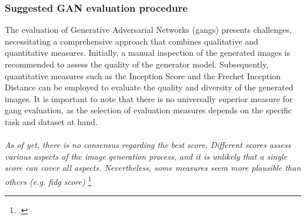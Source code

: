 \subsubsection{Suggested GAN evaluation procedure}
\label{subsubsec:suggested-gan-evaluation-procedure}
The evaluation of Generative Adversarial Networks (\gls{gang}s) presents challenges, necessitating a comprehensive approach that combines qualitative and quantitative measures. 
Initially, a manual inspection of the generated images is recommended to assess the quality of the generator model. Subsequently, quantitative measures such as the Inception Score and the Frechet Inception Distance can be employed to evaluate the quality and diversity of the generated images. 
It is important to note that there is no universally superior measure for \gls{gang} evaluation, as the selection of evaluation measures depends on the specific task and dataset at hand.\\\\
\emph{
    As of yet, there is no consensus regarding the best score. Different scores assess various aspects of the image generation process, and it is unlikely that a single score can cover all aspects. Nevertheless, some measures seem more plausible than others (e.g. \gls{fidg} score)
}\footcite{paper:ganeval}
